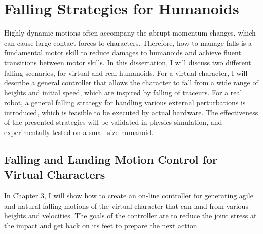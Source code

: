 \section{Falling Strategies for Humanoids}
Highly dynamic motions often accompany the abrupt momentum changes, which can
cause large contact forces to characters.
Therefore, how to manage falls is a fundamental motor skill to reduce damages
to humanoids and achieve fluent transitions between motor skills.
In this dissertation, I will discuss two different falling scenarios, 
for  virtual and real humanoids.
For a virtual character, I will describe a general controller that allows the character to fall from a wide range of heights and initial speed,
which are inspired by falling of traceurs.
For a real robot, a general falling strategy for handling various 
external perturbations is introduced, which is feasible to be
executed by actual hardware.
The effectiveness of the presented strategies will be validated in physics
simulation, and experimentally tested on a small-size humanoid.

\subsection{Falling and Landing Motion Control for Virtual Characters}

In Chapter 3, I will show how to create an on-line controller for generating 
agile and natural falling motions of the virtual character that can land from 
various heights and velocities.
The goals of the controller are to reduce the joint stress at the impact and
get back on its feet to prepare the next action.

